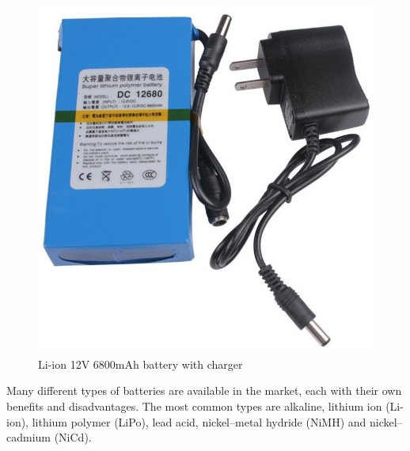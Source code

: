 		\begin{figure}[H]
				\centering
				\includegraphics[scale=0.25]{images/ProjectComponents/battery.jpg}
				\caption{Li-ion 12V 6800mAh battery with charger}
				\label{}
		\end{figure}
		\bigskip

	Many different types of batteries are available in the market, each with their own benefits and disadvantages. The most common types are alkaline, lithium ion (Li-ion), lithium polymer (LiPo), lead acid, nickel–metal hydride (NiMH) and  nickel–cadmium (NiCd).

